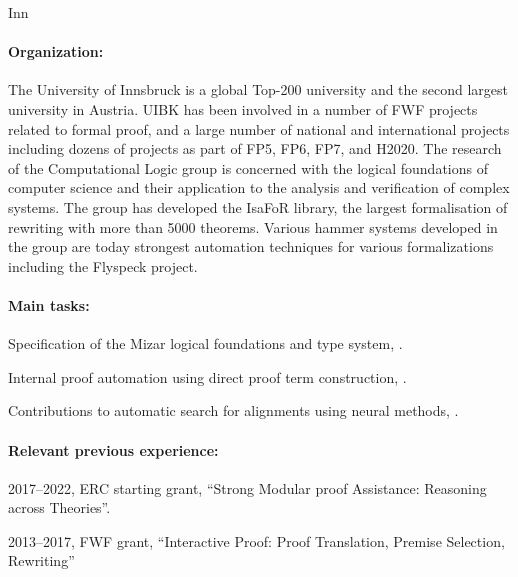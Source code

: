 \begin{sitedescription}{Inn}

\paragraph{Organization:}
The University of Innsbruck is a global Top-200 university and the second
largest university in Austria. UIBK has been involved in a number of FWF
projects related to formal proof, and a large number of national and
international projects including dozens of projects as part of FP5,
FP6, FP7, and H2020.
%
The research of the Computational Logic group is concerned with the logical
foundations of computer science and their application to the analysis and
verification of complex systems. The group has developed the IsaFoR library,
the largest formalisation of rewriting with more than 5000 theorems. Various
hammer systems developed in the group are today strongest automation techniques
for various formalizations including the Flyspeck project.

\paragraph{Main tasks:}

\begin{compactitem}
\item Specification of the Mizar logical foundations and type system,  .
\item Internal proof automation using direct proof term construction, %
   .
\item Contributions to automatic search for alignments using neural methods,  .
\end{compactitem}

\paragraph{Relevant previous experience:}

\begin{compactitem}
\item 2017--2022, ERC starting grant, ``Strong Modular proof Assistance: Reasoning across Theories''.
\item 2013--2017, FWF grant, ``Interactive Proof: Proof Translation, Premise Selection, Rewriting''
\end{compactitem}


\end{sitedescription}
